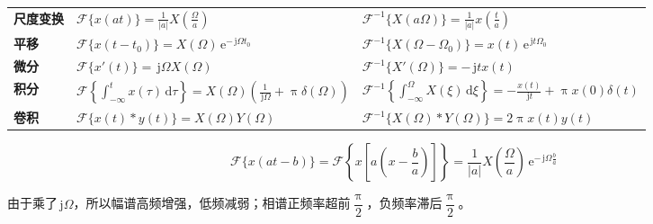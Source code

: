 \documentclass[UTF8,fontset=fandol,zihao=5]{ctexart}
\newcommand{\jj}{\,\mathrm{j}}
\newcommand{\ee}{\,\mathrm{e}}
\newcommand{\dd}{\,\mathrm{d}}
\newcommand{\FF}{\mathcal{F}}
\begin{document}
\begin{enumerate}
\begin{center}
\begin{tabularx}{0.98\textwidth}{>{\bfseries}p{1.5cm}X X}
    尺度变换
    &
    $\displaystyle
    \FF \{ x(at) \}
    =
    \frac{1}{|a|}
    X\left(\frac{\varOmega}{a}\right)
    $
    &
    $\displaystyle
    \FF^{-1} \{ X(a\varOmega) \}
    =
    \frac{1}{|a|}
    x\left(\frac{t}{a}\right)
    $
    \\

    平移
    &
    $\displaystyle
    \FF \{ x(t-t_0) \}
    =
    X(\varOmega)\ee^{-\jj \varOmega t_0}
    $
    &
    $\displaystyle
    \FF^{-1} \{ X(\varOmega-\varOmega_0) \}
    =
    x(t)\ee^{\jj t\varOmega_0}
    $
    \\

    微分
    &
    $\displaystyle
    \FF \{ x'(t) \}
    =
    \jj \varOmega X(\varOmega)
    $


    &
    $\displaystyle
    \FF^{-1} \{ X'(\varOmega) \}
    =
    -\jj t x(t)
    $
    \\

    积分
    &
    $\displaystyle
    \FF
    \left\{
    \int_{-\infty}^{t} x(\tau)\dd\tau
    \right\}
    =
    X(\varOmega)
    \left(
    \frac{1}{\jj\varOmega}
    +
    \uppi\delta(\varOmega)
    \right)
    $
    &
    $\displaystyle
    \FF^{-1}
    \left\{
    \int_{-\infty}^{\varOmega} X(\xi)\dd\xi
    \right\}
    =
    -\frac{x(t)}{\jj t}
    +
    \uppi x(0)\delta(t)
    $
    \\

    卷积
    &
    $\displaystyle
    \FF \{ x(t)\ast y(t) \}
    =
    X(\varOmega)Y(\varOmega)
    $
    &
    $\displaystyle
    \FF^{-1}
    \{ X(\varOmega)\ast Y(\varOmega) \}
    =
    2\uppi x(t)y(t)
    $
    \\

    \bottomrule
    \end{tabularx}
    \end{center}

\end{enumerate}

\begin{methodbox}[【技巧】时移与尺度变换对应]
  \[
  \FF \{x(at-b)\}=\FF \left\{x\left[ a \left( x - \frac{b}{a} \right)  \right] \right\} = \frac{1}{|a|} X \left( \frac{\varOmega}{a} \right) \ee^{-\jj \varOmega \frac{b}{a}}
  \]
\end{methodbox}


\begin{methodbox}[【理解】微分的实际意义]
  由于乘了$\jj \varOmega$，所以幅谱高频增强，低频减弱；相谱正频率超前$\dfrac{\uppi}{2}$，负频率滞后$\dfrac{\uppi}{2}$。
\end{methodbox}
\end{document}
